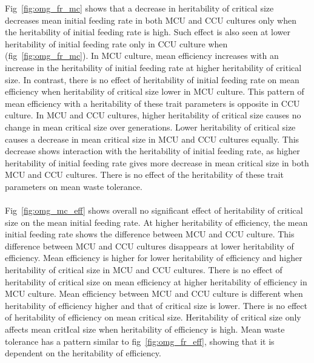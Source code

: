 \noindent Fig~\ref{fig:omg_fr_mc} shows that a decrease in heritability of critical size decreases mean initial feeding rate in both MCU and CCU cultures only when the heritability of initial feeding rate is high. Such effect is also seen at lower heritability of initial feeding rate only in CCU culture when (fig~\ref{fig:omg_fr_mc}). In MCU culture, mean efficiency increases with an increase in the heritability of initial feeding rate at higher heritability of critical size. In contrast, there is no effect of heritability of initial feeding rate on mean efficiency when heritability of critical size lower in MCU culture. This pattern of mean efficiency with a heritability of these trait parameters is opposite in CCU culture. In MCU and CCU cultures, higher heritability of critical size causes no change in mean critical size over generations. Lower heritability of critical size causes a decrease in mean critical size in MCU and CCU cultures equally. This decrease shows interaction with the heritability of initial feeding rate, as higher heritability of initial feeding rate gives more decrease in mean critical size in both MCU and CCU cultures. There is no effect of the heritability of these trait parameters on mean waste tolerance.\\\\
Fig~\ref{fig:omg_mc_eff} shows overall no significant effect of heritability of critical size on the mean initial feeding rate. At higher heritability of efficiency, the mean initial feeding rate shows the difference between MCU and CCU culture. This difference between MCU and CCU cultures disappears at lower heritability of efficiency. Mean efficiency is higher for lower heritability of efficiency and higher heritability of critical size in MCU and CCU cultures. There is no effect of heritability of critical size on mean efficiency at higher heritability of efficiency in MCU culture. Mean efficiency between MCU and CCU culture is different when heritability of efficiency higher and that of critical size is lower. There is no effect of heritability of efficiency on mean critical size. Heritability of critical size only affects mean critIcal size when heritability of efficiency is high. Mean waste tolerance has a pattern similar to fig~\ref{fig:omg_fr_eff}, showing that it is dependent on the heritability of efficiency.
